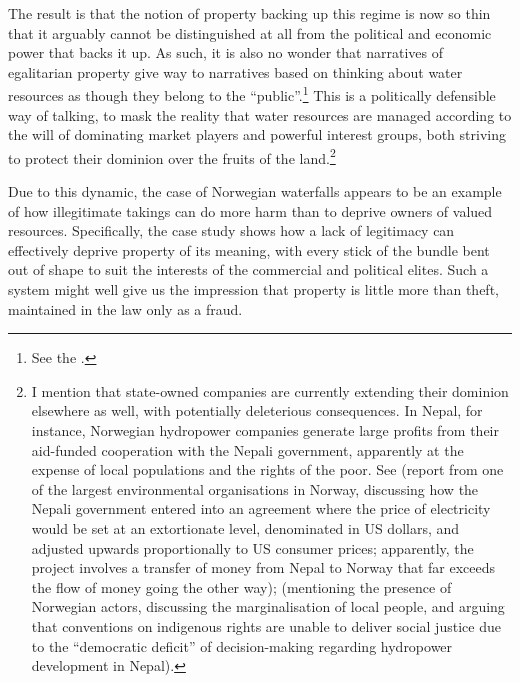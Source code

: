 The result is that the notion of property backing up this regime is now so thin that it arguably cannot be distinguished at all from the political and economic power that backs it up. As such, it is also no wonder that narratives of egalitarian property give way to narratives based on thinking about water resources as though they belong to the ``public''.\footnote{See the \dni\cite[1]{ica17}.} This is a politically defensible way of talking, to mask the reality that water resources are managed according to the will of dominating market players and powerful interest groups, both striving to protect their dominion over the fruits of the land.\footnote{I mention that state-owned companies are currently extending their dominion elsewhere as well, with potentially deleterious consequences. In Nepal, for instance, Norwegian hydropower companies generate large profits from their aid-funded cooperation with the Nepali government, apparently at the expense of local populations and the rights of the poor. See \cite{gaarder15} (report from one of the largest environmental organisations in Norway, discussing how the Nepali government entered into an agreement where the price of electricity would be set at an extortionate level, denominated in US dollars, and adjusted upwards proportionally to US consumer prices; apparently, the project involves a transfer of money from Nepal to Norway that far exceeds the flow of money going the other way); \cite[644]{peris12} (mentioning the presence of Norwegian actors, discussing the marginalisation of local people, and arguing that conventions on indigenous rights are unable to deliver social justice due to the ``democratic deficit'' of decision-making regarding hydropower development in Nepal).}

Due to this dynamic, the case of Norwegian waterfalls appears to be an example of how illegitimate takings can do more harm than to deprive owners of valued resources. Specifically, the case study shows how a lack of legitimacy can effectively deprive property of its meaning, with every stick of the 
bundle bent out of shape to suit the interests of the commercial and political elites. Such a system might well give us the impression that property is little more than theft, maintained in the law only as a fraud.

